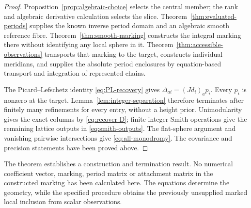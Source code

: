 \begin{proof}
Proposition~\ref{prop:algebraic-choice} selects the central member;
the rank and algebraic derivative calculation selects the slice.
Theorem~\ref{thm:evaluated-periods} supplies the known inverse
period domain and an algebraic smooth reference fibre.
Theorem~\ref{thm:smooth-marking} constructs the integral marking
there without identifying any local sphere in it.
Theorem~\ref{thm:accessible-observations} transports that marking
to the target, constructs individual meridians, and supplies the
absolute period enclosures by equation-based transport and
integration of represented chains.

The Picard--Lefschetz identity \eqref{eq:PL-recovery} gives
$\Delta_{ai}=(Jd_i)_a p_i$. Every $p_i$ is nonzero at the target.
Lemma~\ref{lem:integer-separation} therefore terminates after
finitely many refinements for every entry, without a height
prior. Unimodularity gives the exact columns by
\eqref{eq:recover-D}; finite integer Smith operations give the
remaining lattice outputs in \eqref{eq:smith-outputs}.
The flat-sphere argument and vanishing pairwise intersections
give \eqref{eq:all-monodromy}. The covariance and precision
statements have been proved above.
\end{proof}

The theorem establishes a construction and termination result.
No numerical coefficient vector, marking, period matrix or attachment
matrix in the constructed marking has been calculated here. The equations
determine the geometry, while the specified procedure obtains the
previously unsupplied marked local inclusion from scalar observations.
